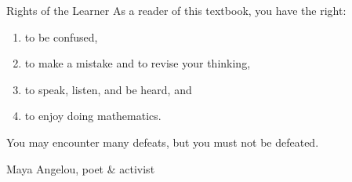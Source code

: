 \begin{section}{Rights of the Learner}\label{sec:Rights of the Learner}
As a reader of this textbook, you have the right:
\begin{enumerate}
\item to be confused,
\item to make a mistake and to revise your thinking,
\item to speak, listen, and be heard, and
\item to enjoy doing mathematics.
\end{enumerate}

\epigraph{You may encounter many defeats, but you must not be defeated.}{Maya Angelou, poet \& activist}

\end{section}

